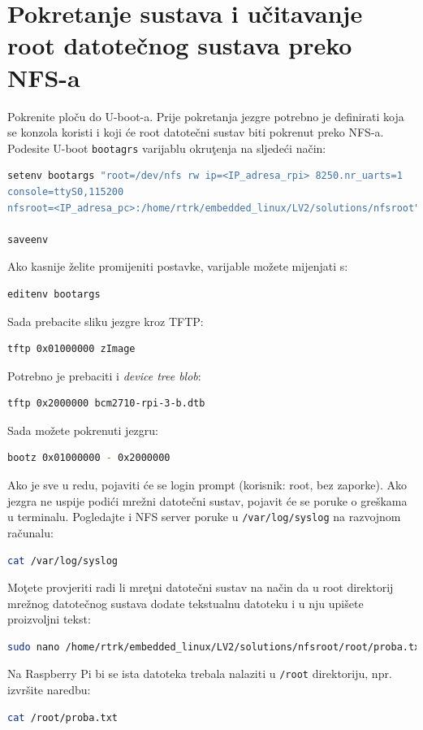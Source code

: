 \documentclass[11pt]{article}
\begin{document}
\section{Pokretanje sustava i učitavanje root datotečnog sustava preko NFS-a}
Pokrenite ploču do U-boot-a. Prije pokretanja jezgre potrebno je definirati
 koja se konzola koristi i koji će root datotečni sustav biti pokrenut preko
 NFS-a. Podesite U-boot \texttt{bootagrs} varijablu okruţenja na sljedeći
 način:
\begin{lstlisting}[language=bash]
setenv bootargs "root=/dev/nfs rw ip=<IP_adresa_rpi> 8250.nr_uarts=1
console=ttyS0,115200
nfsroot=<IP_adresa_pc>:/home/rtrk/embedded_linux/LV2/solutions/nfsroot"

saveenv
\end{lstlisting}
Ako kasnije želite promijeniti postavke, varijable možete mijenjati s:
\begin{lstlisting}[language=bash]
editenv bootargs
\end{lstlisting}
Sada prebacite sliku jezgre kroz TFTP:
\begin{lstlisting}[language=bash]
tftp 0x01000000 zImage
\end{lstlisting}
Potrebno je prebaciti i \textit{device tree blob}:
\begin{lstlisting}[language=bash]
tftp 0x2000000 bcm2710-rpi-3-b.dtb
\end{lstlisting}
Sada možete pokrenuti jezgru:
\begin{lstlisting}[language=bash]
bootz 0x01000000 - 0x2000000
\end{lstlisting}
Ako je sve u redu, pojaviti će se login prompt (korisnik: root, bez zaporke).
 Ako jezgra ne uspije podići mrežni datotečni sustav, pojavit će se poruke o
 greškama u terminalu. Pogledajte i NFS server poruke u \texttt{/var/log/syslog}
 na razvojnom računalu:
\begin{lstlisting}[language=bash]
cat /var/log/syslog
\end{lstlisting}
Moţete provjeriti radi li mreţni datotečni sustav na način da u root direktorij
 mrežnog datotečnog sustava dodate tekstualnu datoteku i u nju upišete
 proizvoljni tekst:
\begin{lstlisting}[language=bash]
sudo nano /home/rtrk/embedded_linux/LV2/solutions/nfsroot/root/proba.txt
\end{lstlisting}
Na Raspberry Pi bi se ista datoteka trebala nalaziti u \texttt{/root}
 direktoriju, npr. izvršite naredbu:
\begin{lstlisting}[language=bash]
cat /root/proba.txt
\end{lstlisting}
\end{document}
